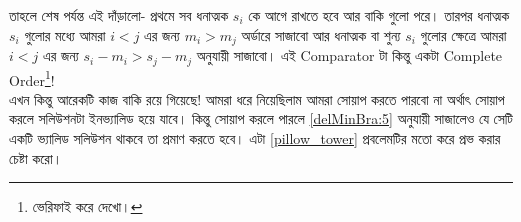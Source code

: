 \begin{solution}
\begin{equation}
\end{equation}
তাহলে শেষ পর্যন্ত এই দাঁড়ালো- প্রথমে সব ধনাত্মক $s_i$ কে আগে রাখতে হবে আর বাকি গুলো পরে। তারপর ধনাত্মক $s_i$ গুলোর মধ্যে আমরা $i < j$ এর জন্য $m_i > m_j$ অর্ডারে সাজাবো আর ধনাত্মক বা শুন্য $s_i$ গুলোর ক্ষেত্রে আমরা $i < j$ এর জন্য $s_i - m_i > s_j - m_j$ অনুযায়ী সাজাবো। এই Comparator টা কিন্তু একটা Complete Order\footnote{ভেরিফাই করে দেখো।}!\\
এখন কিন্তু আরেকটি কাজ বাকি রয়ে গিয়েছে! আমরা ধরে নিয়েছিলাম আমরা সোয়াপ করতে পারবো না অর্থাৎ সোয়াপ করলে সলিউশনটা ইনভ্যালিড হয়ে যাবে। কিন্তু সোয়াপ করলে পারলে \eqref{delMinBra:5} অনুযায়ী সাজালেও যে সেটি একটি ভ্যালিড সলিউশন থাকবে তা প্রমাণ করতে হবে। এটা \ref{pillow_tower} প্রবলেমটির মতো করে প্রভ করার চেষ্টা করো।
\end{solution}
